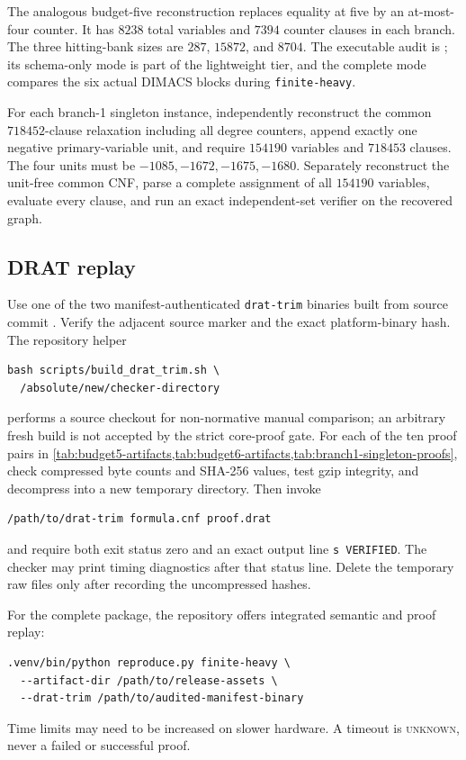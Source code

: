 The analogous budget-five reconstruction replaces equality at five by an
at-most-four counter.  It has \(8238\) total variables and \(7394\) counter
clauses in each branch.  The three hitting-bank sizes are \(287\), \(15872\),
and \(8704\).
The executable audit is
; its schema-only mode is part of
the lightweight tier, and the complete mode compares the six actual DIMACS
blocks during \texttt{finite-heavy}.

For each branch-1 singleton instance, independently reconstruct the common
\(718452\)-clause relaxation including all degree counters, append exactly one
negative primary-variable unit, and require \(154190\) variables and
\(718453\) clauses.  The four units must be \(-1085,-1672,-1675,-1680\).
Separately reconstruct the unit-free common CNF, parse a complete assignment
of all \(154190\) variables, evaluate every clause, and run an exact
independent-set verifier on the recovered graph.

\subsection{DRAT replay}

Use one of the two manifest-authenticated \texttt{drat-trim} binaries built
from source commit
.  Verify the adjacent source
marker and the exact platform-binary hash.  The repository helper
\begin{verbatim}
bash scripts/build_drat_trim.sh \
  /absolute/new/checker-directory
\end{verbatim}
performs a source checkout for non-normative manual comparison; an arbitrary
fresh build is not accepted by the strict core-proof gate.  For each of the
ten proof pairs in
\cref{tab:budget5-artifacts,tab:budget6-artifacts,tab:branch1-singleton-proofs},
check compressed byte counts and SHA-256 values,
test gzip integrity, and decompress into a new temporary directory.  Then invoke
\begingroup\small
\begin{verbatim}
/path/to/drat-trim formula.cnf proof.drat
\end{verbatim}
\endgroup
and require both exit status zero and an exact output line
\texttt{s VERIFIED}.  The checker may print timing diagnostics after that
status line.
Delete the temporary raw files only after recording the uncompressed hashes.

For the complete package, the repository offers integrated semantic and proof
replay:
\begingroup\scriptsize
\begin{verbatim}
.venv/bin/python reproduce.py finite-heavy \
  --artifact-dir /path/to/release-assets \
  --drat-trim /path/to/audited-manifest-binary
\end{verbatim}
\endgroup
Time limits may need to be increased on slower hardware.  A timeout is
\textsc{unknown}, never a failed or successful proof.


